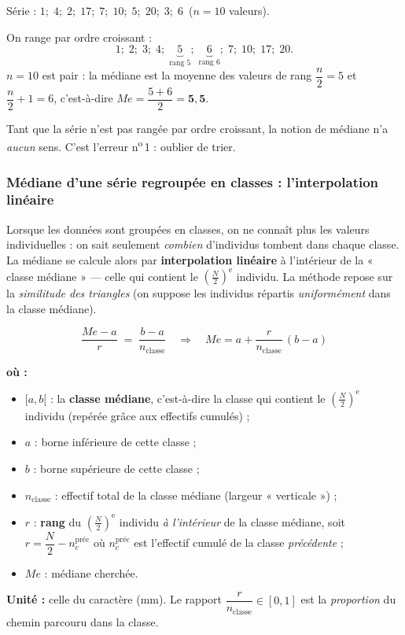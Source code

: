 \documentclass[11pt,a4paper]{article}
\newenvironment{ou}{%
  \par\smallskip\noindent\textbf{où :}\nopagebreak
  \begin{itemize}[leftmargin=1.8em,topsep=2pt,itemsep=1.5pt,parsep=0pt]}%
  {\end{itemize}}
\newcommand{\med}{M\!e}                  %
\begin{document}
\begin{exemple}
Série : $1;\;4;\;2;\;17;\;7;\;10;\;5;\;20;\;3;\;6$ \,($n=10$ valeurs).
\smallskip

On range par ordre croissant :
\[ 1;\;2;\;3;\;4;\;\underbrace{5}_{\text{rang }5};\;\underbrace{6}_{\text{rang }6};\;7;\;10;\;17;\;20. \]
$n=10$ est pair : la médiane est la moyenne des valeurs de rang $\dfrac{n}{2}=5$ et
$\dfrac{n}{2}+1=6$, c'est-à-dire
$\med=\dfrac{5+6}{2}=\mathbf{5{,}5}$.
\end{exemple}

\begin{attention}
Tant que la série n'est pas rangée par ordre croissant, la notion de médiane n'a \emph{aucun} sens.
C'est l'erreur n\textsuperscript{o}\,1 : oublier de trier.
\end{attention}

\subsubsection{Médiane d'une série regroupée en classes : l'interpolation linéaire}

Lorsque les données sont groupées en classes, on ne connaît plus les valeurs individuelles : on sait
seulement \emph{combien} d'individus tombent dans chaque classe. La médiane se calcule alors par
\textbf{interpolation linéaire} à l'intérieur de la « classe médiane » --- celle qui contient le
$\left(\tfrac{N}{2}\right)^{\text{e}}$ individu. La méthode repose sur la \emph{similitude des
triangles} (on suppose les individus répartis \emph{uniformément} dans la classe médiane).

\begin{formule}
\[
\boxed{\;\dfrac{\med-a}{r}\;=\;\dfrac{b-a}{n_{\text{classe}}}
\quad\Longrightarrow\quad
\med=a+\dfrac{r}{n_{\text{classe}}}\,(b-a)\;}
\]
\begin{ou}
  \item $[a,b[$ : la \textbf{classe médiane}, c'est-à-dire la classe qui contient le
        $\left(\tfrac{N}{2}\right)^{\text{e}}$ individu (repérée grâce aux effectifs cumulés) ;
  \item $a$ : borne inférieure de cette classe ;
  \item $b$ : borne supérieure de cette classe ;
  \item $n_{\text{classe}}$ : effectif total de la classe médiane (largeur « verticale ») ;
  \item $r$ : \textbf{rang} du $\left(\tfrac{N}{2}\right)^{\text{e}}$ individu \emph{à l'intérieur}
        de la classe médiane, soit $r=\dfrac{N}{2}-n_{c}^{\text{préc}}$
        où $n_{c}^{\text{préc}}$ est l'effectif cumulé de la classe \emph{précédente} ;
  \item $\med$ : médiane cherchée.
\end{ou}
\textbf{Unité :} celle du caractère (mm). Le rapport $\dfrac{r}{n_{\text{classe}}}\in[0,1]$ est la
\emph{proportion} du chemin parcouru dans la classe.
\end{formule}
\end{document}
